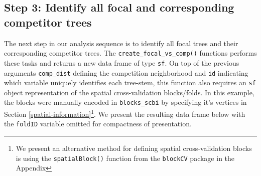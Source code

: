 \documentclass[12pt]{article}
\newenvironment{Shaded}{\begin{snugshade}}{\end{snugshade}}
\newcommand{\AlertTok}[1]{\textcolor[rgb]{0.94,0.16,0.16}{#1}}
\newcommand{\CommentTok}[1]{\textcolor[rgb]{0.56,0.35,0.01}{\textit{#1}}}
\newcommand{\DataTypeTok}[1]{\textcolor[rgb]{0.13,0.29,0.53}{#1}}
\newcommand{\KeywordTok}[1]{\textcolor[rgb]{0.13,0.29,0.53}{\textbf{#1}}}
\newcommand{\NormalTok}[1]{#1}
\newcommand{\OperatorTok}[1]{\textcolor[rgb]{0.81,0.36,0.00}{\textbf{#1}}}
\newcommand{\StringTok}[1]{\textcolor[rgb]{0.31,0.60,0.02}{#1}}
\begin{document}
\hypertarget{focal-vs-comp}{%
\subsection{Step 3: Identify all focal and corresponding competitor
trees}\label{focal-vs-comp}}

The next step in our analysis sequence is to identify all focal trees
and their corresponding competitor trees. The
\texttt{create\_focal\_vs\_comp()} functions performs these tasks and
returns a new data frame of type \texttt{sf}. On top of the previous
arguments \texttt{comp\_dist} defining the competition neighborhood and
\texttt{id} indicating which variable uniquely identifies each
tree-stem, this function also requires an \texttt{sf} object
representation of the spatial cross-validation blocks/folds. In this
example, the blocks were manually encoded in \texttt{blocks\_scbi} by
specifying it's vertices in Section \ref{spatial-information}\footnote{We
  present an alternative method for defining spatial cross-validation
  blocks is using the \texttt{spatialBlock()} function from the
  \texttt{blockCV} package in the Appendix}. We present the resulting
data frame below with the \texttt{foldID} variable omitted for
compactness of presentation.

\begin{Shaded}
\end{Shaded}
\end{document}
